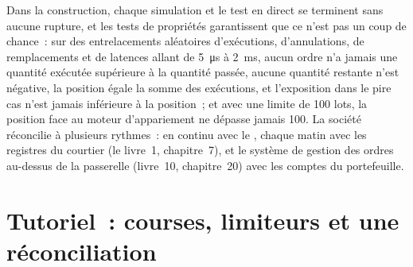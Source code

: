 \label{lst:ll:order-gateway-and-order-management:reconcile}

Dans la construction, chaque simulation et le test en direct se terminent sans aucune rupture, et les tests de propriétés garantissent que ce n'est pas
un coup de chance~: sur des entrelacements aléatoires d'exécutions, d'annulations, de remplacements et de latences allant de \qty{5}{\micro\second} à \qty{2}{\milli\second},
aucun ordre n'a jamais une quantité exécutée supérieure à la quantité passée, aucune quantité restante n'est négative, la position égale la somme des exécutions, et
l'exposition dans le pire cas n'est jamais inférieure à la position~; et avec une limite de 100 lots, la position face au moteur d'appariement
ne dépasse jamais 100. La société réconcilie à plusieurs rythmes~: en continu avec le , chaque matin avec
les registres du courtier (le livre~1, chapitre~7), et le système de gestion des ordres au-dessus de la passerelle (livre~10,
chapitre~20) avec les comptes du portefeuille.

\section{Tutoriel~: courses, limiteurs et une réconciliation}\label{tut:ll:order-gateway-and-order-management:tut}

